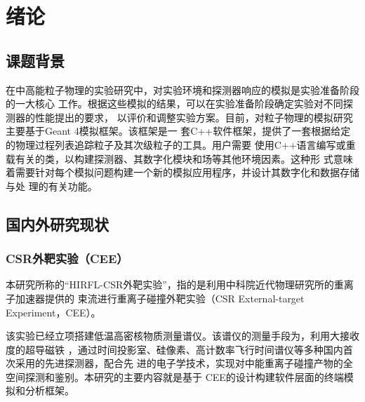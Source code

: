 \documentclass[bachelor,openany,oneside,color]{buaathesis}
\begin{document}

\makeatletter
{}
\makeatother




\pagestyle{mainmatter}
\maketitle

\tableofcontents

\mainmatter

\chapter{绪论}

\section{课题背景}

在中高能粒子物理的实验研究中，对实验环境和探测器响应的模拟是实验准备阶段的一大核心
工作。根据这些模拟的结果，可以在实验准备阶段确定实验对不同探测器的性能提出的要求，
以评价和调整实验方案。目前，对粒子物理的模拟研究主要基于Geant 4模拟框架。该框架是一
套C++软件框架，提供了一套根据给定的物理过程列表追踪粒子及其次级粒子的工具。用户需要
使用C++语言编写或重载有关的类，以构建探测器、其数字化模块和场等其他环境因素。这种形
式意味着需要针对每个模拟问题构建一个新的模拟应用程序，并设计其数字化和数据存储与处
理的有关功能。

\section{国内外研究现状}

\subsection{CSR外靶实验（CEE）}

本研究所称的“HIRFL-CSR外靶实验”，指的是利用中科院近代物理研究所的重离子加速器提供的
束流进行重离子碰撞外靶实验（CSR External-target Experiment，CEE）。

该实验已经立项搭建低温高密核物质测量谱仪。该谱仪的测量手段为，利用大接收度的超导磁铁
，通过时间投影室、硅像素、高计数率飞行时间谱仪等多种国内首次采用的先进探测器，配合先
进的电子学技术，实现对中能重离子碰撞产物的全空间探测和鉴别。本研究的主要内容就是基于
CEE的设计构建软件层面的终端模拟和分析框架。
\end{document}
